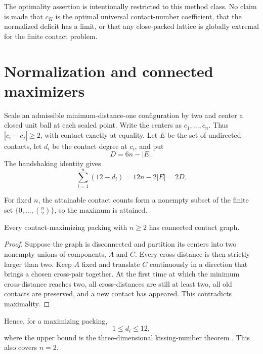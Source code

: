 The optimality assertion is intentionally restricted to this method class.  No
claim is made that $c_K$ is the optimal universal contact-number coefficient, that
the normalized deficit has a limit, or that any close-packed lattice is globally
extremal for the finite contact problem.

\section{Normalization and connected maximizers}

Scale an admissible minimum-distance-one configuration by two and center a closed
unit ball at each scaled point.  Write the centers as $c_1,\ldots,c_n$.  Thus
$|c_i-c_j|\ge2$, with contact exactly at equality.  Let $E$ be the set of
undirected contacts, let $d_i$ be the contact degree at $c_i$, and put
\begin{equation}\label{eq:deficit}
 D=6n-|E|.
\end{equation}
The handshaking identity gives
\begin{equation}\label{eq:handshake}
 \sum_{i=1}^n(12-d_i)=12n-2|E|=2D.
\end{equation}

For fixed $n$, the attainable contact counts form a nonempty subset of the finite
set $\{0,\ldots,\binom n2\}$, so the maximum is attained.

\begin{lemma}\label{lem:connected}
Every contact-maximizing packing with $n\ge2$ has connected contact graph.
\end{lemma}

\begin{proof}
Suppose the graph is disconnected and partition its centers into two nonempty
unions of components, $A$ and $C$.  Every cross-distance is then strictly larger
than two.  Keep $A$ fixed and translate $C$ continuously in a direction that
brings a chosen cross-pair together.  At the first time at which the minimum
cross-distance reaches two, all cross-distances are still at least two, all old
contacts are preserved, and a new contact has appeared.  This contradicts
maximality.
\end{proof}

Hence, for a maximizing packing,
\begin{equation}\label{eq:degreerange}
 1\le d_i\le12,
\end{equation}
where the upper bound is the three-dimensional kissing-number theorem
\cite{SchuetteWaerden1953}.  This also covers $n=2$.
